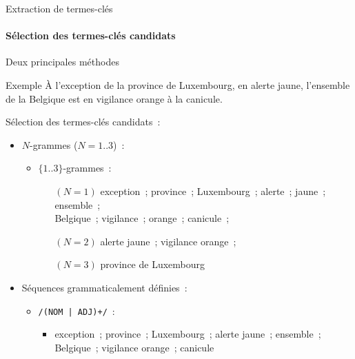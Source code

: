   \begin{frame}{Extraction de termes-clés}\framesubtitle{Sélection des termes-clés candidats}
    Deux principales méthodes

    \begin{exampleblock}{Exemple}
      \og{}À l'exception de la province de Luxembourg, en alerte jaune,
      l'ensemble de la Belgique est en vigilance orange à la canicule.\fg{}

      \vspace{1em}

      Sélection des termes-clés candidats~:
      \begin{itemize}
        \item{$N$-grammes ($N = 1..3$)~:}
          \begin{itemize}
            \item{$\{1..3\}$-grammes~:}
            \begin{itemize}\setlength{\itemindent}{.5cm}
              \item[$(N = 1)$]{
                exception~; province~; Luxembourg~; alerte~; jaune~; ensemble~;\\
                \hspace{.5cm}Belgique~; vigilance~; orange~; canicule~;
              }
              \item[$(N = 2)$]{
                alerte jaune~; vigilance orange~;
              }
              \item[$(N = 3)$]{
                province de Luxembourg
              }
            \end{itemize}
          \end{itemize}
        \item{Séquences grammaticalement définies~:}
          \begin{itemize}
            \item{\texttt{/(NOM | ADJ)+/}~:}
            \begin{itemize}\setlength{\itemindent}{.5cm}
              \item{exception~; province~; Luxembourg~; alerte jaune~;
                    ensemble~;\\
                    \hspace{.5cm}Belgique~; vigilance orange~; canicule}
            \end{itemize}
          \end{itemize}
      \end{itemize}
    \end{exampleblock}
  \end{frame}


